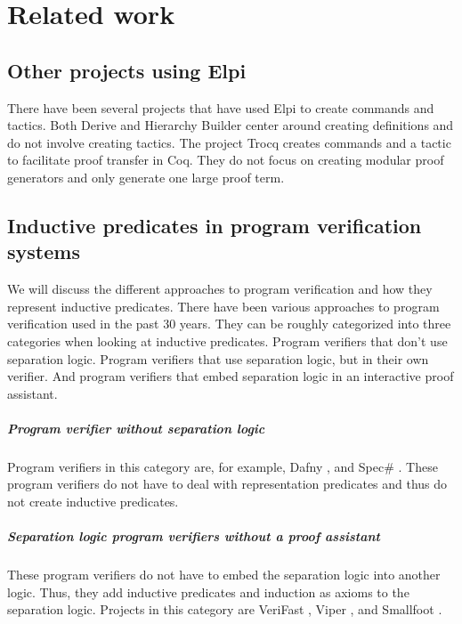 \documentclass[thesis.tex]{subfiles}
\begin{document}
\VerbatimFootnotes

\chapter{Related work} \label{ch:relatedwork}

\section{Other projects using Elpi}
There have been several projects that have used Elpi to create commands and tactics. Both Derive \cite{tassiDerivingProvedEquality2019} and Hierarchy Builder \cite{cohenHierarchyBuilderAlgebraic2020} center around creating definitions and do not involve creating tactics. The project Trocq \cite{cohenTrocqProofTransfer2024} creates commands and a tactic to facilitate proof transfer in Coq. They do not focus on creating modular proof generators and only generate one large proof term.

\section{Inductive predicates in program verification systems}
We will discuss the different approaches to program verification and how they represent inductive predicates.
There have been various approaches to program verification used in the past 30 years. They can be roughly categorized into three categories when looking at inductive predicates. Program verifiers that don't use separation logic. Program verifiers that use separation logic, but in their own verifier. And program verifiers that embed separation logic in an interactive proof assistant.

\paragraph{Program verifier without separation logic}
Program verifiers in this category are, for example, Dafny \cite{leinoDafnyAutomaticProgram2010}, and Spec\# \cite{barnettSpecProgrammingSystem2004,leinoUsingSpecLanguage2010}. These program verifiers do not have to deal with representation predicates and thus do not create inductive predicates.

\paragraph{Separation logic program verifiers without a proof assistant}
These program verifiers do not have to embed the separation logic into another logic. Thus, they add inductive predicates and induction as axioms to the separation logic. Projects in this category are VeriFast \cite{jacobsVeriFastPowerfulSound2011}, Viper \cite{mullerViperVerificationInfrastructure2016,summersAutomatingDeductiveVerification2018}, and Smallfoot \cite{berdineSmallfootModularAutomatic2005}.
\end{document}
